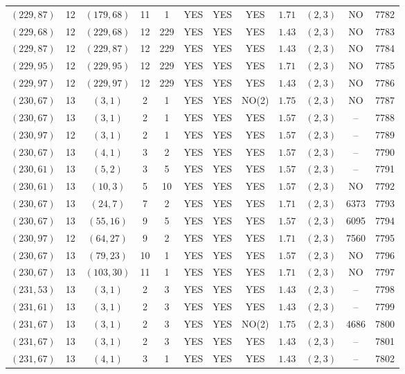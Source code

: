 \begin{longtable}{|c|c|c|c|c|c|c|c|c|c|c|c|}
$(229,87)$ & 12 & $(179,68)$ & 11 & 1 & YES & YES & YES & $1.71$ & $(2,3)$ & NO & 7782\\
$(229,68)$ & 12 & $(229,68)$ & 12 & 229 & YES & YES & YES & $1.43$ & $(2,3)$ & NO & 7783\\
$(229,87)$ & 12 & $(229,87)$ & 12 & 229 & YES & YES & YES & $1.43$ & $(2,3)$ & NO & 7784\\
$(229,95)$ & 12 & $(229,95)$ & 12 & 229 & YES & YES & YES & $1.71$ & $(2,3)$ & NO & 7785\\
$(229,97)$ & 12 & $(229,97)$ & 12 & 229 & YES & YES & YES & $1.43$ & $(2,3)$ & NO & 7786\\
$(230,67)$ & 13 & $(3,1)$ & 2 & 1 & YES & YES & NO(2) & $1.75$ & $(2,3)$ & NO & 7787\\
$(230,67)$ & 13 & $(3,1)$ & 2 & 1 & YES & YES & YES & $1.57$ & $(2,3)$ & -- & 7788\\
$(230,97)$ & 12 & $(3,1)$ & 2 & 1 & YES & YES & YES & $1.57$ & $(2,3)$ & -- & 7789\\
$(230,67)$ & 13 & $(4,1)$ & 3 & 2 & YES & YES & YES & $1.57$ & $(2,3)$ & -- & 7790\\
$(230,61)$ & 13 & $(5,2)$ & 3 & 5 & YES & YES & YES & $1.57$ & $(2,3)$ & -- & 7791\\
$(230,61)$ & 13 & $(10,3)$ & 5 & 10 & YES & YES & YES & $1.57$ & $(2,3)$ & NO & 7792\\
$(230,67)$ & 13 & $(24,7)$ & 7 & 2 & YES & YES & YES & $1.71$ & $(2,3)$ & 6373 & 7793\\
$(230,67)$ & 13 & $(55,16)$ & 9 & 5 & YES & YES & YES & $1.57$ & $(2,3)$ & 6095 & 7794\\
$(230,97)$ & 12 & $(64,27)$ & 9 & 2 & YES & YES & YES & $1.71$ & $(2,3)$ & 7560 & 7795\\
$(230,67)$ & 13 & $(79,23)$ & 10 & 1 & YES & YES & YES & $1.57$ & $(2,3)$ & NO & 7796\\
$(230,67)$ & 13 & $(103,30)$ & 11 & 1 & YES & YES & YES & $1.71$ & $(2,3)$ & NO & 7797\\
$(231,53)$ & 13 & $(3,1)$ & 2 & 3 & YES & YES & YES & $1.43$ & $(2,3)$ & -- & 7798\\
$(231,61)$ & 13 & $(3,1)$ & 2 & 3 & YES & YES & YES & $1.43$ & $(2,3)$ & -- & 7799\\
$(231,67)$ & 13 & $(3,1)$ & 2 & 3 & YES & YES & NO(2) & $1.75$ & $(2,3)$ & 4686 & 7800\\
$(231,67)$ & 13 & $(3,1)$ & 2 & 3 & YES & YES & YES & $1.43$ & $(2,3)$ & -- & 7801\\
$(231,67)$ & 13 & $(4,1)$ & 3 & 1 & YES & YES & YES & $1.43$ & $(2,3)$ & -- & 7802\\

\end{longtable}
